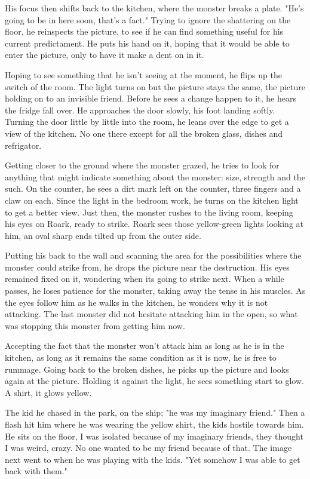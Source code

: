         His focus then shifts back to the kitchen, where the monster breaks a plate. "He's going to be in here soon, that's a fact." Trying
    to ignore the shattering on the floor, he reinspects the picture, to see if he can find something useful for his current predictament. He
    puts his hand on it, hoping that it would be able to enter the picture, only to have it make a dent on in it.

        Hoping to see something that he isn't seeing at the moment, he flips up the switch of the room. The light turns on but the picture 
    stays the same, the picture holding on to an invisible friend. Before he sees a change happen to it, he hears the fridge fall over. 
    He approaches the door slowly, his foot landing softly. Turning the door little by little into the room, he leans over the edge to get a
    view of the kitchen. No one there except for all the broken glass, dishes and refrigator. 

        Getting closer to the ground where the monster grazed, he tries to look for anything that might indicate something about the monster:
    size, strength and the such. On the counter, he sees a dirt mark left on the counter, three fingers and a claw on each. Since the light
    in the bedroom work, he turns on the kitchen light to get a better view. Just then, the monster rushes to the living room, keeping his eyes
    on Roark, ready to strike. Roark sees those yellow-green lights looking at him, an oval sharp ends tilted up from the outer side.

        Putting his back to the wall and scanning the area for the possibilities where the monster could strike from, he drops the picture
    near the destruction. His eyes remained fixed on it, wondering when its going to strike next.  When a while passes, he loses patience for
    the monster, taking away the tense in his muscles. As the eyes follow him as he walks in the kitchen, he wonders why it is not attacking.
    The last monster did not hesitate attacking him in the open, so what was stopping this monster from getting him now.

        Accepting the fact that the monster won't attack him as long as he is in the kitchen, as long as it remains the same condition as it
    is now, he is free to rummage. Going back to the broken dishes, he picks up the picture and looks again at the picture. Holding it against
    the light, he sees something start to glow. A shirt, it glows yellow.

        The kid he chased in the park, on the ship; "he was my imaginary friend." Then a flash hit him where he was wearing the yellow shirt,
    the kids hostile towards him. He sits on the floor, I was isolated because of my imaginary friends, they thought I was weird, crazy. No
    one wanted to be my friend because of that. The image next went to when he was playing with the kids. "Yet somehow I was able to get back
    with them."

